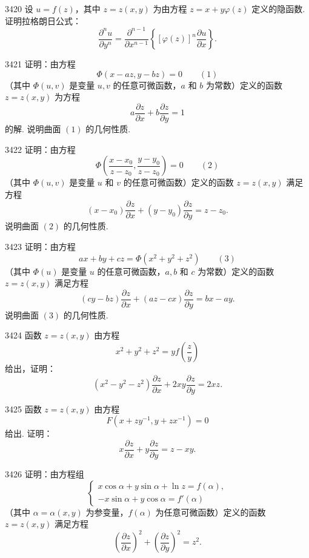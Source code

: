 \begin{prob}[L]{3420}
设 $u = f(z)$，其中 $z = z(x, y)$ 为由方程 $z = x + y\varphi(z)$ 定义的隐函数. 证明拉格朗日公式：
\[
\frac{\partial^n u}{\partial y^n} = \frac{\partial^{n-1}}{\partial x^{n-1}}\left\{[\varphi(z)]^n \frac{\partial u}{\partial x}\right\}.
\]
\end{prob}

\begin{prob}[M]{3421}
证明：由方程
\[
\Phi(x - az, y - bz) = 0 \qquad (1)
\]
（其中 $\Phi(u, v)$ 是变量 $u, v$ 的任意可微函数，$a$ 和 $b$ 为常数）定义的函数 $z = z(x, y)$ 为方程
\[
a\frac{\partial z}{\partial x} + b\frac{\partial z}{\partial y} = 1
\]
的解. 说明曲面 $(1)$ 的几何性质.
\end{prob}

\begin{prob}[M]{3422}
证明：由方程
\[
\Phi\left(\frac{x - x_0}{z - z_0}, \frac{y - y_0}{z - z_0}\right) = 0 \qquad (2)
\]
（其中 $\Phi(u, v)$ 是变量 $u$ 和 $v$ 的任意可微函数）定义的函数 $z = z(x, y)$ 满足方程
\[
(x - x_0)\frac{\partial z}{\partial x} + (y - y_0)\frac{\partial z}{\partial y} = z - z_0.
\]
说明曲面 $(2)$ 的几何性质.
\end{prob}

\begin{prob}[M]{3423}
证明：由方程
\[
ax + by + cz = \Phi(x^2 + y^2 + z^2) \qquad (3)
\]
（其中 $\Phi(u)$ 是变量 $u$ 的任意可微函数，$a, b$ 和 $c$ 为常数）定义的函数 $z = z(x, y)$ 满足方程
\[
(cy - bz)\frac{\partial z}{\partial x} + (az - cx)\frac{\partial z}{\partial y} = bx - ay.
\]
说明曲面 $(3)$ 的几何性质.
\end{prob}

\begin{prob}[M]{3424}
函数 $z = z(x, y)$ 由方程
\[
x^2 + y^2 + z^2 = yf\left(\frac{z}{y}\right)
\]
给出，证明：
\[
(x^2 - y^2 - z^2)\frac{\partial z}{\partial x} + 2xy\frac{\partial z}{\partial y} = 2xz.
\]
\end{prob}

\begin{prob}[M]{3425}
函数 $z = z(x, y)$ 由方程
\[
F(x + zy^{-1}, y + zx^{-1}) = 0
\]
给出. 证明：
\[
x\frac{\partial z}{\partial x} + y\frac{\partial z}{\partial y} = z - xy.
\]
\end{prob}

\begin{prob}[M]{3426}
证明：由方程组
\[
\begin{cases}
x\cos\alpha + y\sin\alpha + \ln z = f(\alpha), \\
-x\sin\alpha + y\cos\alpha = f'(\alpha)
\end{cases}
\]
（其中 $\alpha = \alpha(x, y)$ 为参变量，$f(\alpha)$ 为任意可微函数）定义的函数 $z = z(x, y)$ 满足方程
\[
\left(\frac{\partial z}{\partial x}\right)^2 + \left(\frac{\partial z}{\partial y}\right)^2 = z^2.
\]
\end{prob}

